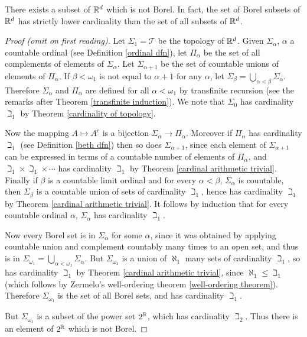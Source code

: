 \begin{lemma}
\label{Borel sigma algebra}
There exists a subset of $\mathbb{R}^d$ which is not Borel.
In fact, the set of Borel subsets of $\mathbb{R}^d$ has strictly lower cardinality than the set of all subsets of $\mathbb{R}^d$.
\end{lemma}
\begin{proof}[Proof (omit on first reading)]
Let $\Sigma_1 = \mathcal T$ be the topology of $\mathbb{R}^d$.
Given $\Sigma_\alpha$, $\alpha$ a countable ordinal (see Definition \ref{ordinal dfn}), let $\Pi_\alpha$ be the set of all complements of elements of $\Sigma_\alpha$.
Let $\Sigma_{\alpha+1}$ be the set of countable unions of elements of $\Pi_\alpha$.
If $\beta < \omega_1$ is not equal to $\alpha+1$ for any $\alpha$, let $\Sigma_{\beta} = \bigcup_{\alpha < \beta} \Sigma_\alpha$.
Therefore $\Sigma_\alpha$ and $\Pi_\alpha$ are defined for all $\alpha < \omega_1$ by transfinite recursion (see the remarks after Theorem \ref{transfinite induction}).
We note that $\Sigma_0$ has cardinality $\beth_1$ by Theorem \ref{cardinality of topology}.

Now the mapping $A \mapsto A^c$ is a bijection $\Sigma_{\alpha} \to \Pi_\alpha$.
Moreover if $\Pi_\alpha$ has cardinality $\beth_1$ (see Definition \ref{beth dfn}) then so does $\Sigma_{\alpha+1}$, since each element of $\Sigma_{\alpha+1}$ can be expressed in terms of a countable number of elements of $\Pi_\alpha$, and $\beth_1 \times \beth_1 \times \cdots$ has cardinality $\beth_1$ by Theorem \ref{cardinal arithmetic trivial}.
Finally if $\beta$ is a countable limit ordinal and for every $\alpha < \beta$, $\Sigma_\alpha$ is countable, then $\Sigma_\beta$ is a countable union of sets of cardinality $\beth_1$, hence has cardinality $\beth_1$ by Theorem \ref{cardinal arithmetic trivial}.
It follows by induction that for every countable ordinal $\alpha$, $\Sigma_\alpha$ has cardinality $\beth_1$.

Now every Borel set is in $\Sigma_\alpha$ for some $\alpha$, since it was obtained by applying countable union and complement countably many times to an open set, and thus is in $\Sigma_{\omega_1} = \bigcup_{\alpha < \omega_1} \Sigma_\alpha$.
But $\Sigma_{\omega_1}$ is a union of $\aleph_1$ many sets of cardinality $\beth_1$, so has cardinality $\beth_1$ by Theorem \ref{cardinal arithmetic trivial},
since $\aleph_1 \leq \beth_1$ (which follows by Zermelo's well-ordering theorem \ref{well-ordering theorem}).
Therefore $\Sigma_{\omega_1}$ is the set of all Borel sets, and has cardinality $\beth_1$.

But $\Sigma_{\omega_1}$ is a subset of the power set $2^{\mathbb{R}}$, which has cardinality $\beth_2$. Thus there is an element of $2^{\mathbb{R}}$ which is not Borel.
\end{proof}

